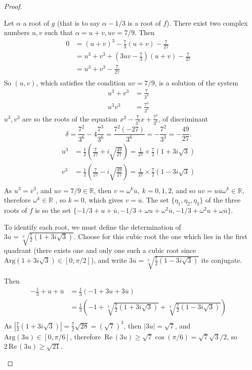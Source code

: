 \documentclass[11pt,a4paper]{article}
\newcommand{\R}{\mathbb{R}}
\newcommand{\re}{\,\mathrm{Re}\,}
\begin{document}
\begin{proof}
\begin{enumerate}
Let $\alpha$ a root of $g$ (that is to say $\alpha - 1/3$ is a root of $f$). There exist two complex numbers $u,v$ such that
$\alpha = u+v, uv = 7/9$. Then
\begin{align*}
0 &= (u+v)^3 -\frac{7}{3}(u+v) - \frac{7}{27}\\
&=u^3+v^3+\left(3uv-\frac{7}{3} \right)(u+v) -\frac{7}{27}\\
&=u^3+v^3 -\frac{7}{27}\\
\end{align*}
So $(u,v)$, which satisfies the condition $uv = 7/9$, is a solution of the system
\begin{align*}
u^3+v^3 &= \frac{7}{3^3}\\
u^3v^3&= \frac{7^3}{3^6}
\end{align*}
$u^3,v^3$ are so the roots of the equation $x^2-\frac{7}{3^3}x+ \frac{7^3}{3^6}$, of discriminant $$\delta = \frac{7^2}{3^6} - 4 \frac{7^3}{3^6}= \frac{7^2(-27)}{3^6} =-\frac{7^2}{3^3} = -\frac{49}{27}.$$
\begin{align*}
u^3 &= \frac{1}{2}\left(\frac{7}{27} + i \sqrt{\frac{49}{27}} \right) = \frac{1}{27} \times \frac{7}{2} \left(1 + 3i\sqrt{3} \right)\\
v^3 &= \frac{1}{2}\left(\frac{7}{27} - i \sqrt{\frac{49}{27}} \right)= \frac{1}{27} \times \frac{7}{2} \left(1 - 3i\sqrt{3} \right)\\
\end{align*}
As $u^3 = \overline{v}^3$, and $uv = 7/9 \in \R$, then $v = \omega^k \overline{u},\ k = 0,1,2$, and so $uv = u \overline{u} \omega^k \in \R$, therefore $\omega^k \in \R$ , so $k=0$, which gives  $v= \overline{u}$.
The set $\{\eta_1,\eta_2,\eta_3\}$ of the three roots of $f$ is so the set $\{-1/3+ u+\overline{u},-1/3+ \omega u + \omega^2\overline{u},-1/3+ \omega^2 u +\omega \overline{u}\}$.

To identify each root, we must define the determination of $3u = \sqrt[3]{\frac{7}{2} \left(1 + 3i\sqrt{3} \right)}$. Choose for this cubic root the one which lies in the first  quadrant (there exists one and only one such a cubic root since $\mathrm{Arg}(1+3i\sqrt{3}) \in [0,\pi/2]$), and write $3 \overline{u} = \sqrt[3]{\frac{7}{2} \left(1 - 3i\sqrt{3} \right)}$ its conjugate.

Then
\begin{align*}
-\frac{1}{3} + u + \overline{u} &= \frac{1}{3}(-1+3u+3\overline{u})\\
&=\frac{1}{3}\left(-1+\sqrt[3]{\frac{7}{2} \left(1 + 3i\sqrt{3} \right)}+\sqrt[3]{\frac{7}{2} \left(1 - 3i\sqrt{3} \right)}\right)\\
\end{align*}
As $\left \vert \frac{7}{2}\left(1+3i\sqrt{3}\right)\right \vert = \frac{7}{2} \sqrt{28} =(\sqrt{7})^3$, then
 $\vert 3u\vert = \sqrt{7}$, and $\mathrm{Arg}(3u)\in [0,\pi/6]$, therefore $\re(3u)\geq \sqrt{7}\cos(\pi/6) = \sqrt{7}\sqrt{3}/2$, so $2\re(3u) \geq \sqrt{21}$.


\end{enumerate}
\end{proof}
\end{document}
